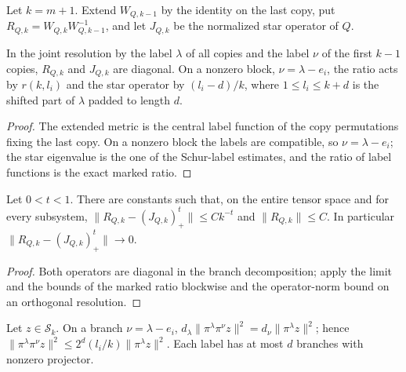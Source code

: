 Let $k=m+1$. Extend $W_{Q,k-1}$ by the identity on the last copy, put
$R_{Q,k}=W_{Q,k}W_{Q,k-1}^{-1}$, and let $J_{Q,k}$ be the normalized star
operator of $Q$.

\begin{lemma}
    \label{lem:marked_ratio_branches}
    \leanok
    In the joint resolution by the label $\lambda$ of all copies and the label
    $\nu$ of the first $k-1$ copies, $R_{Q,k}$ and $J_{Q,k}$ are diagonal. On a
    nonzero block, $\nu=\lambda-e_i$, the ratio acts by $r(k,l_i)$ and the star
    operator by $(l_i-d)/k$, where $1\le l_i\le k+d$ is the shifted part of
    $\lambda$ padded to length $d$.
\end{lemma}

\begin{proof}\leanok
    The extended metric is the central label function of the copy permutations
    fixing the last copy. On a nonzero block the labels are compatible, so
    $\nu=\lambda-e_i$; the star eigenvalue is the one of the Schur-label
    estimates, and the ratio of label functions is the exact marked ratio.
\end{proof}

\begin{theorem}
    \label{thm:marked_ratio_forward}
    \leanok
    Let $0<t<1$. There are constants such that, on the entire tensor space and
    for every subsystem,
    $\|R_{Q,k}-(J_{Q,k})_+^t\|\le Ck^{-t}$ and $\|R_{Q,k}\|\le C$. In particular
    $\|R_{Q,k}-(J_{Q,k})_+^t\|\to0$.
\end{theorem}

\begin{proof}\leanok
    Both operators are diagonal in the branch decomposition; apply the limit and
    the bounds of the marked ratio blockwise and the operator-norm bound on an
    orthogonal resolution.
\end{proof}

\begin{lemma}
    \label{lem:symmetric_branch_weights}
    \leanok
    Let $z\in\mathcal S_k$. On a branch $\nu=\lambda-e_i$,
    $d_\lambda\|\pi^\lambda\pi^\nu z\|^2=d_\nu\|\pi^\lambda z\|^2$; hence
    $\|\pi^\lambda\pi^\nu z\|^2\le2^d(l_i/k)\|\pi^\lambda z\|^2$. Each label has at
    most $d$ branches with nonzero projector.
\end{lemma}

